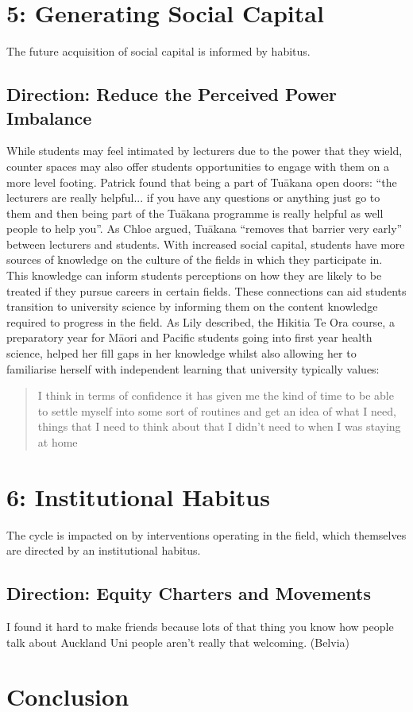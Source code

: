 \section{5: Generating Social Capital}
The future acquisition of social capital is informed by habitus.

\subsection{Direction: Reduce the Perceived Power Imbalance}
While students may feel intimated by lecturers due to the power that they wield, counter spaces may also offer students opportunities to engage with them on a more level footing. Patrick found that being a part of Tu\={a}kana open doors: ``the lecturers are really helpful... if you have any questions or anything just go to them and then being part of the Tu\={a}kana programme is really helpful as well people to help you''. As Chloe argued, Tu\={a}kana ``removes that barrier very early'' between lecturers and students. With increased social capital, students have more sources of knowledge on the culture of the fields in which they participate in. This knowledge can inform students perceptions on how they are likely to be treated if they pursue careers in certain fields. These connections can aid students transition to university science by informing them on the content knowledge required to progress in the field. As Lily described, the Hikitia Te Ora course, a preparatory year for M\={a}ori and Pacific students going into first year health science, helped her fill gaps in her knowledge whilst also allowing her to familiarise herself with independent learning that university typically values: \blockquote{I think in terms of confidence it has given me the kind of time to be able to settle myself into some sort of routines and get an idea of what I need, things that I need to think about that I didn't need to when I was staying at home}. 


\section{6: Institutional Habitus}
The cycle is impacted on by interventions operating in the field, which themselves are directed by an institutional habitus.


\subsection{Direction: Equity Charters and Movements}
I found it hard to make friends because lots of that thing you know how people talk about Auckland Uni people aren’t really that welcoming. (Belvia)


\section{Conclusion}


